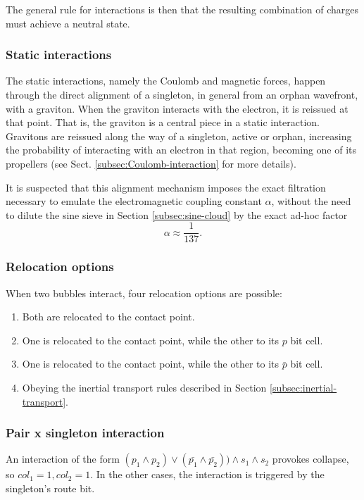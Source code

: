 \documentclass[12pt,english]{article}
\begin{document}
The general rule for interactions is then that the resulting combination of charges must achieve a neutral state.

\subsubsection{Static interactions}
The static interactions, namely the Coulomb and magnetic forces, happen through the direct alignment of a singleton, in general from an orphan wavefront, with a graviton. When the graviton interacts with the electron, it is reissued at that point. That is, the graviton is a central piece in a static interaction. Gravitons are reissued along the way of a singleton, active or orphan, increasing the probability of interacting with an electron in that region, becoming one of its propellers (see Sect. \ref{subsec:Coulomb-interaction} for more details).

It is suspected that this alignment mechanism imposes the exact filtration necessary to emulate the electromagnetic coupling constant $\alpha$, without the need to dilute the sine sieve in Section \ref{subsec:sine-cloud} by the exact ad-hoc factor
\[
\alpha\approx\frac{1}{137}.
\]

\subsubsection{Relocation options} \label{subsub:options}
When two bubbles interact, four relocation options are possible:
\begin{enumerate}
\item Both are relocated to the contact point.
    \item One is relocated to the contact point, while the other to its $p$ bit cell.
    \item One is relocated to the contact point, while the other to its $\bar{p}$ bit cell.
    \item Obeying the inertial transport rules described in Section \ref{subsec:inertial-transport}.
\end{enumerate}

\subsubsection{Pair x singleton interaction}
An interaction of the form $(p_1\wedge p_2)\vee (\bar{p_1}\wedge\bar{p_2}))\wedge s_1\wedge s_2$ provokes collapse, so $col_1=1,col_2=1$. In the other cases, the interaction is triggered by the singleton's route bit.
\end{document}
